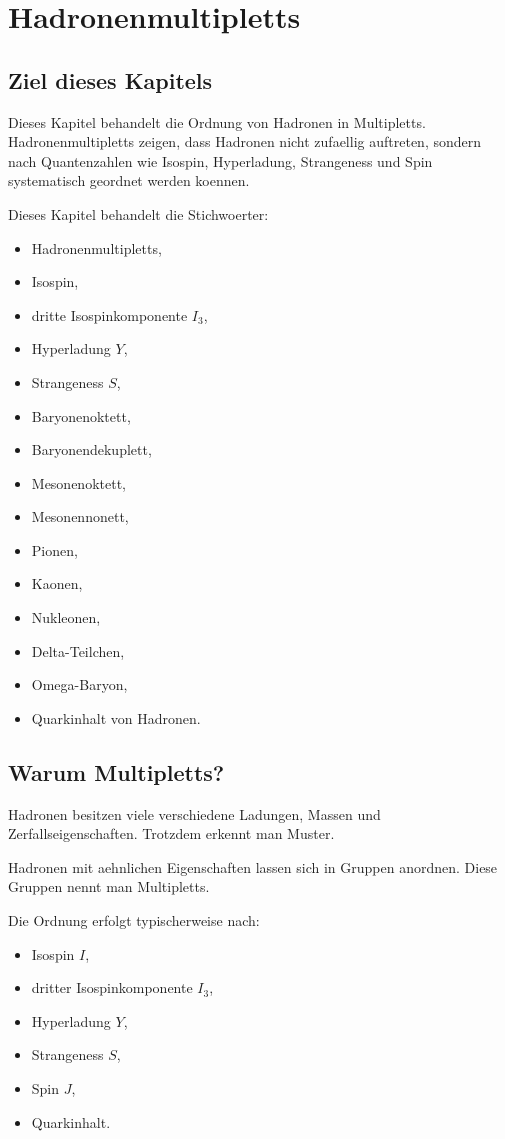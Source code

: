\chapter{Hadronenmultipletts}

\section{Ziel dieses Kapitels}

Dieses Kapitel behandelt die Ordnung von Hadronen in Multipletts.
Hadronenmultipletts zeigen, dass Hadronen nicht zufaellig auftreten, sondern nach
Quantenzahlen wie Isospin, Hyperladung, Strangeness und Spin systematisch geordnet
werden koennen.

\begin{notebox}
Dieses Kapitel behandelt die Stichwoerter:
\begin{itemize}
    \item Hadronenmultipletts,
    \item Isospin,
    \item dritte Isospinkomponente $I_3$,
    \item Hyperladung $Y$,
    \item Strangeness $S$,
    \item Baryonenoktett,
    \item Baryonendekuplett,
    \item Mesonenoktett,
    \item Mesonennonett,
    \item Pionen,
    \item Kaonen,
    \item Nukleonen,
    \item Delta-Teilchen,
    \item Omega-Baryon,
    \item Quarkinhalt von Hadronen.
\end{itemize}
\end{notebox}

\section{Warum Multipletts?}

Hadronen besitzen viele verschiedene Ladungen, Massen und Zerfallseigenschaften.
Trotzdem erkennt man Muster.

\begin{conceptbox}
Hadronen mit aehnlichen Eigenschaften lassen sich in Gruppen anordnen.
Diese Gruppen nennt man Multipletts.

Die Ordnung erfolgt typischerweise nach:
\begin{itemize}
    \item Isospin $I$,
    \item dritter Isospinkomponente $I_3$,
    \item Hyperladung $Y$,
    \item Strangeness $S$,
    \item Spin $J$,
    \item Quarkinhalt.
\end{itemize}
\end{conceptbox}


